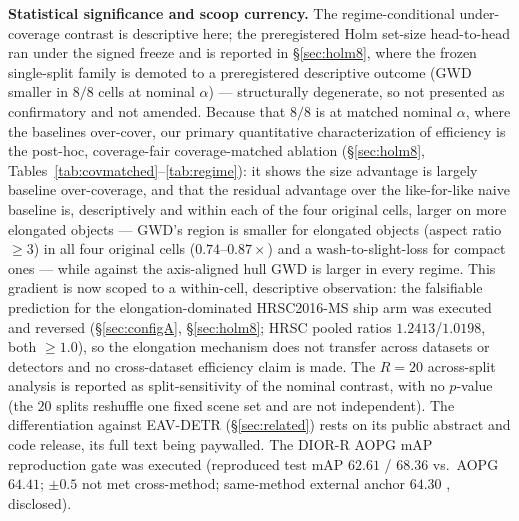 \documentclass[11pt]{article}
\begin{document}
\textbf{Statistical significance and scoop currency.} The regime-conditional under-coverage contrast is
descriptive here; the preregistered Holm set-size head-to-head ran under the signed freeze and is reported in
\S\ref{sec:holm8}, where the frozen single-split family is demoted to a preregistered descriptive
outcome (GWD smaller in $8/8$ cells at nominal $\alpha$) --- structurally degenerate, so not presented as
confirmatory and not amended. Because that $8/8$ is at matched nominal $\alpha$, where the baselines
over-cover, our primary quantitative characterization of efficiency is the post-hoc, coverage-fair
coverage-matched ablation (\S\ref{sec:holm8}, Tables~\ref{tab:covmatched}--\ref{tab:regime}): it shows the
size advantage is largely baseline over-coverage, and that the residual advantage over the like-for-like
naive baseline is, descriptively and within each of the four original cells, larger on more elongated
objects --- GWD's region is smaller for elongated objects (aspect ratio $\ge3$) in all four original cells
($0.74$--$0.87\times$) and a wash-to-slight-loss for compact ones --- while against the axis-aligned hull GWD
is larger in every regime. This gradient is now
scoped to a within-cell, descriptive observation: the falsifiable prediction for the
elongation-dominated HRSC2016-MS ship arm was executed and reversed (\S\ref{sec:configA},
\S\ref{sec:holm8}; HRSC pooled ratios $1.2413$/$1.0198$, both $\ge1.0$), so the elongation mechanism does not
transfer across datasets or detectors and no cross-dataset efficiency claim is made. The $R{=}20$ across-split analysis is reported as
split-sensitivity of the nominal contrast, with no $p$-value (the $20$ splits reshuffle one fixed
scene set and are not independent). The differentiation against EAV-DETR
\citep{eavdetr2026} (\S\ref{sec:related}) rests on its public abstract and code release, its full text being
paywalled. The DIOR-R AOPG mAP reproduction
gate was executed (reproduced test mAP $62.61$ / $68.36$ vs.\ AOPG $64.41$; $\pm0.5$ not met cross-method;
same-method external anchor $64.30$ \citep{ding2026rtoriented}, disclosed).
\end{document}
